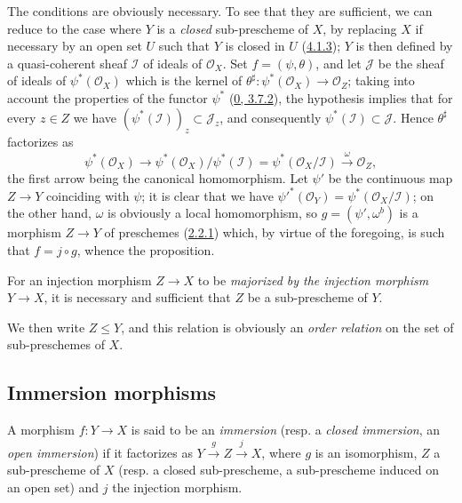 The conditions are obviously necessary. To see that they are
sufficient, we can reduce to the case where $Y$ is a \emph{closed}
sub-prescheme of $X$, by replacing $X$ if necessary by an open set $U$ such that
$Y$ is closed in $U$ (\hyperref[I.4.1.3]{4.1.3}); $Y$ is then defined
by a quasi-coherent sheaf $\mathscr{I}$ of ideals of $\mathscr{O}_X$.
Set $f=(\psi,\theta)$, and let $\mathscr{J}$ be the sheaf of ideals of
$\psi^*(\mathscr{O}_X)$ which is the kernel of
$\theta^\sharp:\psi^*(\mathscr{O}_X)\to\mathscr{O}_Z$; taking into account the
properties of the functor $\psi^*$ (\hyperref[0.3.7.2]{0, 3.7.2}),
the hypothesis implies that for every $z\in Z$ we have
$(\psi^*(\mathscr{I}))_z\subset\mathscr{J}_z$, and consequently
$\psi^*(\mathscr{I})\subset\mathscr{J}$. Hence $\theta^\sharp$
factorizes as
\[
  \psi^*(\mathscr{O}_X)\longrightarrow
  \psi^*(\mathscr{O}_X)/\psi^*(\mathscr{I})
  =\psi^*(\mathscr{O}_X/\mathscr{I})
  \xrightarrow{\omega}\mathscr{O}_Z,
\]
the first arrow being the canonical homomorphism. Let $\psi'$ be the continuous
map $Z\to Y$ coinciding with $\psi$; it is clear that we have
${\psi'}^*(\mathscr{O}_Y)=\psi^*(\mathscr{O}_X/\mathscr{I})$; on the other
hand, $\omega$ is obviously a local homomorphism, so
$g=(\psi',\omega^b)$ is a morphism $Z\to Y$
of preschemes (\hyperref[I.2.2.1]{2.2.1}) which, by virtue of the
foregoing, is such that $f=j\circ g$, whence the proposition.

\begin{corollary}[4.1.10]
\label{I.4.1.10}
For an injection morphism $Z\to X$ to be \emph{majorized by the injection
morphism} $Y\to X$, it is necessary and sufficient that $Z$ be a sub-prescheme
of $Y$.
\end{corollary}

We then write $Z\leq Y$, and this relation is obviously an
\emph{order relation} on the set of sub-preschemes of $X$.

\subsection{Immersion morphisms}
\label{subsection:I.4.2}

\begin{definition}[4.2.1]
\label{I.4.2.1}
A morphism $f:Y\to X$ is said to be an \emph{immersion} (resp. a
\emph{closed immersion}, an \emph{open immersion}) if it factorizes as
$Y\xrightarrow{g}Z\xrightarrow{j}X$, where $g$ is an isomorphism, $Z$ a
sub-prescheme of $X$ (resp. a closed sub-prescheme, a sub-prescheme induced
on an open set) and $j$ the injection morphism.
\end{definition}

